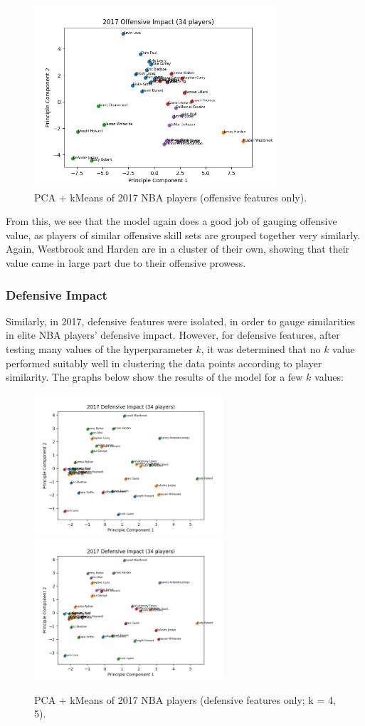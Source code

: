 \documentclass{article}
\begin{document}
\begin{figure}[h]
  \centering
  \includegraphics[width=9cm]{2017_Graphs/PCA_2017_Offensive.png}
  \caption{PCA + kMeans of 2017 NBA players (offensive features only).}
\end{figure}

From this, we see that the model again does a good job of gauging offensive value, as players of similar offensive skill sets are grouped together very similarly. Again, Westbrook and Harden are in a cluster of their own, showing that their value came in large part due to their offensive prowess.

\subsubsection{Defensive Impact}

Similarly, in 2017, defensive features were isolated, in order to gauge similarities in elite NBA players' defensive impact. However, for defensive features, after testing many values of the hyperparameter $k$, it was determined that no $k$ value performed suitably well in clustering the data points according to player similarity. The graphs below show the results of the model for a few $k$ values:

\begin{figure}[h]
  \includegraphics[width=7cm]{2017_Graphs/PCA_2017_Defensive_4.png}
  \includegraphics[width=7cm]{2017_Graphs/PCA_2017_Defensive_5.png}
  \caption{PCA + kMeans of 2017 NBA players (defensive features only; k = 4, 5).}
\end{figure}
\end{document}
